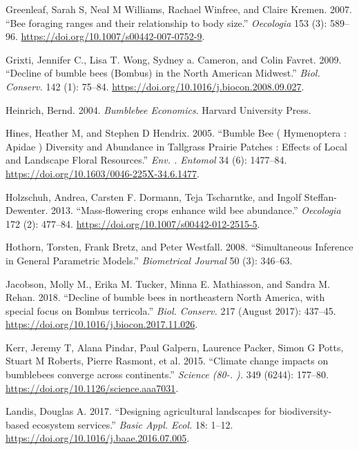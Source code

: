 \documentclass[11pt,]{article}
\begin{document}
\leavevmode\hypertarget{ref-Greenleaf2007b}{}%
Greenleaf, Sarah S, Neal M Williams, Rachael Winfree, and Claire Kremen.
2007. ``Bee foraging ranges and their relationship to body size.''
\emph{Oecologia} 153 (3): 589--96.
\url{https://doi.org/10.1007/s00442-007-0752-9}.

\leavevmode\hypertarget{ref-Grixti2009}{}%
Grixti, Jennifer C., Lisa T. Wong, Sydney a. Cameron, and Colin Favret.
2009. ``Decline of bumble bees (Bombus) in the North American Midwest.''
\emph{Biol. Conserv.} 142 (1): 75--84.
\url{https://doi.org/10.1016/j.biocon.2008.09.027}.

\leavevmode\hypertarget{ref-Heinrich2004}{}%
Heinrich, Bernd. 2004. \emph{Bumblebee Economics}. Harvard University
Press.

\leavevmode\hypertarget{ref-Hines2005}{}%
Hines, Heather M, and Stephen D Hendrix. 2005. ``Bumble Bee (
Hymenoptera : Apidae ) Diversity and Abundance in Tallgrass Prairie
Patches : Effects of Local and Landscape Floral Resources.'' \emph{Env.
. Entomol} 34 (6): 1477--84.
\url{https://doi.org/10.1603/0046-225X-34.6.1477}.

\leavevmode\hypertarget{ref-Holzschuh2013}{}%
Holzschuh, Andrea, Carsten F. Dormann, Teja Tscharntke, and Ingolf
Steffan-Dewenter. 2013. ``Mass-flowering crops enhance wild bee
abundance.'' \emph{Oecologia} 172 (2): 477--84.
\url{https://doi.org/10.1007/s00442-012-2515-5}.

\leavevmode\hypertarget{ref-multcomp}{}%
Hothorn, Torsten, Frank Bretz, and Peter Westfall. 2008. ``Simultaneous
Inference in General Parametric Models.'' \emph{Biometrical Journal} 50
(3): 346--63.

\leavevmode\hypertarget{ref-Jacobson2018a}{}%
Jacobson, Molly M., Erika M. Tucker, Minna E. Mathiasson, and Sandra M.
Rehan. 2018. ``Decline of bumble bees in northeastern North America,
with special focus on Bombus terricola.'' \emph{Biol. Conserv.} 217
(August 2017): 437--45.
\url{https://doi.org/10.1016/j.biocon.2017.11.026}.

\leavevmode\hypertarget{ref-Kerr2015}{}%
Kerr, Jeremy T, Alana Pindar, Paul Galpern, Laurence Packer, Simon G
Potts, Stuart M Roberts, Pierre Rasmont, et al. 2015. ``Climate change
impacts on bumblebees converge across continents.'' \emph{Science (80-.
).} 349 (6244): 177--80. \url{https://doi.org/10.1126/science.aaa7031}.

\leavevmode\hypertarget{ref-Landis2017}{}%
Landis, Douglas A. 2017. ``Designing agricultural landscapes for
biodiversity-based ecosystem services.'' \emph{Basic Appl. Ecol.} 18:
1--12. \url{https://doi.org/10.1016/j.baae.2016.07.005}.
\end{document}
